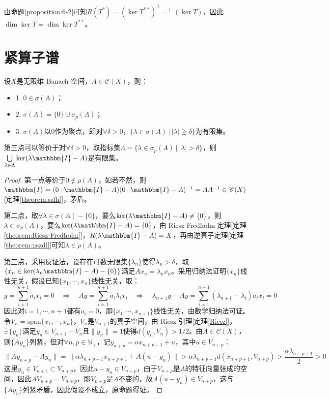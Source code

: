 \begin{remark}
\quad 由命题\ref{proposition:6-2}可知$R(T^*)=(\ker T^{**})^{\perp}=^{\perp}(\ker T)$，因此$\dim\ker T=\dim\ker T^{**}$。
\end{remark}

\newpage
\section{紧算子谱}\label{jszp}
\begin{theorem}
设$X$是无限维 Banach 空间，$A \in \mathscr{C}(X)$，则：
\begin{itemize}
\item 1. $0 \in \sigma(A)$；
\item 2. $\sigma(A)=\{0\}\cup\sigma_p(A)$；
\item 3. $\sigma(A)$以0作为聚点，即对$\forall \delta>0$，$\{\lambda\in\sigma(A) \ | \ |\lambda|\geq\delta\}$为有限集。
\end{itemize}
\end{theorem}
\begin{remark}
\quad 第三点可以等价于对$\forall \delta>0$，取指标集$\Lambda=\{\lambda\in\sigma_p(A) \ | \ |\lambda|>\delta\}$，则$\bigcup\limits_{\lambda\in\Lambda}\ker(\lambda\mathbbm{I}-A)$是有限集。
\end{remark}
\begin{proof}
第一点等价于$0 \notin \rho(A)$，如若不然，则$\mathbbm{I}=(0\cdot\mathbbm{I}-A)(0\cdot\mathbbm{I}-A)^{-1}=AA^{-1}\in\mathscr{C}(X)$[定理\ref{theorem:szfh}]，矛盾。

第二点，取$\forall \lambda \in \sigma(A)-\{0\}$，要么$\ker(\lambda\mathbbm{I}-A)\neq\{0\}$，则$\lambda\in\sigma_p(A)$，要么$\ker(\lambda\mathbbm{I}-A)=\{0\}$，由 Riesz-Fredholm 定理[定理\ref{theorem:Riesz-Fredholm}]，$R(\lambda\mathbbm{I}-A)=X$，再由逆算子定理[定理\ref{theorem:nszdl}]可知$\lambda\in\rho(A)$。

第三点，采用反证法，设存在可数无限集$\{\lambda_n\}$使得$\lambda_n>\delta$，取$\{x_n \in \ker(\lambda_n\mathbbm{I}-A)-\{0\}\}$满足$Ax_n=\lambda_nx_n$。采用归纳法证明$\{x_n\}$线性无关，假设已知$\{x_1,\cdots,x_n\}$线性无关，取：
\[y=\sum_{i=1}^{n+1}a_ix_i=0 \quad \Rightarrow \quad Ay=\sum_{i=1}^{n+1}a_i\lambda_ix_i \quad \Rightarrow \quad \lambda_{n+1}y-Ay=\sum_{i=1}^{n+1}(\lambda_{n+1}-\lambda_i)a_ix_i=0\]
因此对$i=1,\cdots,n+1$都有$a_i=0$，即$\{x_1,\cdots,x_{n+1}\}$线性无关，由数学归纳法可证。令$V_n=\text{span}\{x_1,\cdots,x_n\}$，$V_n$是$V_{n+1}$的真子空间，由 Riesz 引理[定理\ref{Riesz}]，$\exists \, \{y_n\}$满足$y_n \in V_{n+1}-V_n$且$\|y_n\|=1$使得$d(y_n,V_n)>1/2$。由$A \in \mathscr{C}(X)$，则$\{Ay_n\}$列紧，但对$\forall n,p \in \mathbb{N}_+$，记$y_{n+p}=\alpha x_{n+p+1}+u$，其中$u \in V_{n+p}$：
\[\|Ay_{n+p}-Ay_n\|=\|\alpha\lambda_{n+p+1}x_{n+p+1}+A(u-y_n)\|>\alpha\lambda_{n+p+1}d(x_{n+p+1},V_{n+p})>\frac{\alpha\lambda_{n+p+1}}{2}>0\]
这里$y_n \in V_{n+1} \subset V_{n+p}$，因此$u-y_n \in V_{n+p}$，由于$V_{n+p}$是$A$的特征向量张成的空间，因此$AV_{n+p}=V_{n+p}$，即$V_{n+p}$是$A$不变的，故$A(u-y_n) \in V_{n+p}$，这与$\{Ay_n\}$列紧矛盾，因此假设不成立，原命题得证。
\end{proof}
